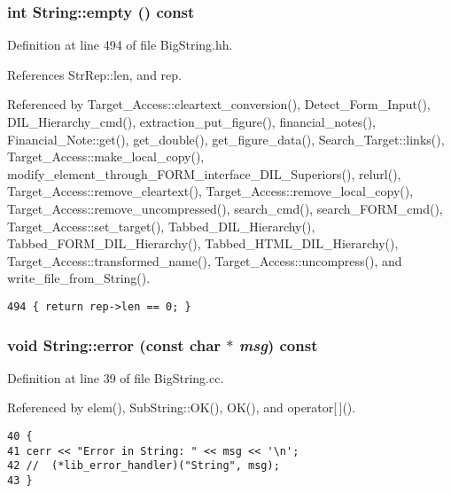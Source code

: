 \subsubsection{\setlength{\rightskip}{0pt plus 5cm}int String::empty () const\hspace{0.3cm}{\tt  [inline]}}\label{classString_a106}




Definition at line 494 of file Big\-String.hh.

References Str\-Rep::len, and rep.

Referenced by Target\_\-Access::cleartext\_\-conversion(), Detect\_\-Form\_\-Input(), DIL\_\-Hierarchy\_\-cmd(), extraction\_\-put\_\-figure(), financial\_\-notes(), Financial\_\-Note::get(), get\_\-double(), get\_\-figure\_\-data(), Search\_\-Target::links(), Target\_\-Access::make\_\-local\_\-copy(), modify\_\-element\_\-through\_\-FORM\_\-interface\_\-DIL\_\-Superiors(), relurl(), Target\_\-Access::remove\_\-cleartext(), Target\_\-Access::remove\_\-local\_\-copy(), Target\_\-Access::remove\_\-uncompressed(), search\_\-cmd(), search\_\-FORM\_\-cmd(), Target\_\-Access::set\_\-target(), Tabbed\_\-DIL\_\-Hierarchy(), Tabbed\_\-FORM\_\-DIL\_\-Hierarchy(), Tabbed\_\-HTML\_\-DIL\_\-Hierarchy(), Target\_\-Access::transformed\_\-name(), Target\_\-Access::uncompress(), and write\_\-file\_\-from\_\-String().



\footnotesize\begin{verbatim}494 { return rep->len == 0; }
\end{verbatim}\normalsize 
{}
\subsubsection{\setlength{\rightskip}{0pt plus 5cm}void String::error (const char $\ast$ {\em msg}) const}\label{classString_a109}




Definition at line 39 of file Big\-String.cc.

Referenced by elem(), Sub\-String::OK(), OK(), and operator[$\,$]().



\footnotesize\begin{verbatim}40 {
41 cerr << "Error in String: " << msg << '\n';
42 //  (*lib_error_handler)("String", msg);
43 }
\end{verbatim}\normalsize 
{}

